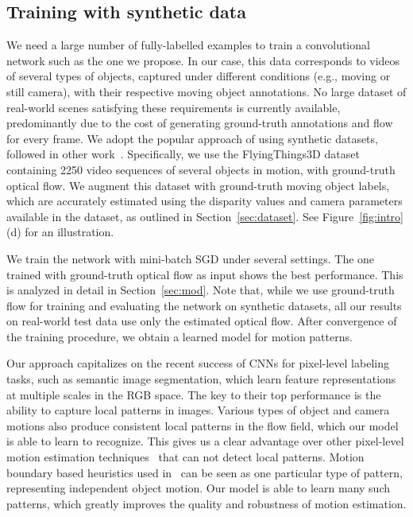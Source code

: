 \subsection{Training with synthetic data}
\label{sec:trainmpnet}
We need a large number of fully-labelled examples to train a convolutional
network such as the one we propose. In our case, this data corresponds to
videos of several types of objects, captured under different conditions (e.g.,
moving or still camera), with their respective moving object annotations. No
large dataset of real-world scenes satisfying these requirements is currently
available, predominantly due to the cost of generating ground-truth annotations
and flow for every frame. We adopt the popular approach of using synthetic
datasets, followed in other work~\cite{Dosovitskiy15,Mayer16}.
Specifically, we use the FlyingThings3D dataset~\cite{Mayer16} containing 2250
video sequences of several objects in motion, with ground-truth optical flow.
We augment this dataset with ground-truth moving object labels, which are
accurately estimated using the disparity values and camera parameters available
in the dataset, as outlined in Section~\ref{sec:dataset}. See
Figure~\ref{fig:intro}(d) for an illustration.

We train the network with mini-batch SGD under several settings. The one
trained with ground-truth optical flow as input shows the best performance.
This is analyzed in detail in Section~\ref{sec:mod}. Note that, while we use
ground-truth flow for training and evaluating the network on synthetic
datasets, all our results on real-world test data use only the estimated
optical flow. After convergence of the training procedure, we obtain a learned
model for motion patterns.

Our approach capitalizes on the recent success of CNNs for pixel-level
labeling tasks, such as semantic image segmentation, which learn feature
representations at multiple scales in the RGB space. The key to their top
performance is the ability to capture local patterns in images. Various types
of object and camera motions also produce consistent local patterns in the flow
field, which our model is able to learn to recognize. This gives us a clear
advantage over other pixel-level motion estimation
techniques~\cite{Bideau16,Narayana13} that can not detect local patterns.
Motion boundary based heuristics used in~\cite{papazoglou2013fast} can be seen
as one particular type of pattern, representing independent object motion. Our
model is able to learn many such patterns, which greatly improves the quality
and robustness of motion estimation.


